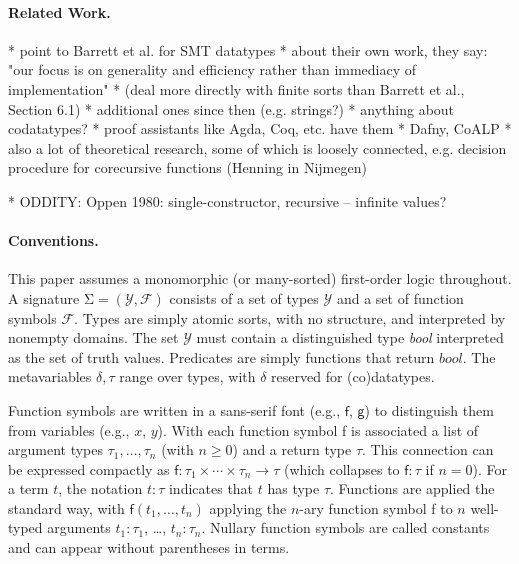 \documentclass[a4paper,oribibl,envcountsame,draft]{llncs}
\newcommand\Sig{\mathrm{\Sigma}}
\newcommand\const[1]{\textsf{#1}}
\newcommand\ty[1]{\textit{#1}}
\newcommand\Types{\mathcal{Y}}
\newcommand\Funcs{\mathcal{F}}
\begin{document}
\paragraph{Related Work.}

    * point to Barrett et al. for SMT datatypes
      * about their own work, they say: "our focus is on generality and
        efficiency rather than immediacy of implementation"
      * (deal more directly with finite sorts than Barrett et al., Section 6.1)
    * additional ones since then (e.g. strings?)
    * anything about codatatypes?
      * proof assistants like Agda, Coq, etc. have them
      * Dafny, CoALP
      * also a lot of theoretical research, some of which is loosely connected,
        e.g. decision procedure for corecursive functions (Henning in Nijmegen)

    * ODDITY: Oppen 1980: single-constructor, recursive -- infinite values?

\paragraph{Conventions.}
This paper assumes a monomorphic (or many-sorted) first-order logic throughout.
A signature $\Sig = (\Types, \Funcs)$ consists of a set of types $\Types$ and a
set of function symbols $\Funcs$. Types are simply atomic sorts, with no
structure, and interpreted by nonempty domains. The set $\Types$ must contain a
distinguished type \ty{bool} interpreted as the set of truth
values. %
Predicates are simply functions that return $\ty{bool}$.
The metavariables $\delta, \tau$ range over types, with $\delta$ reserved
for (co)datatypes.

Function symbols are written in a sans-serif font (e.g., $\const{f}$, $\const{g}$) to
distinguish them from variables (e.g., $x$, $y$). With each function symbol \const{f}
is associated a list of argument types $\tau_1,\ldots,\tau_n$ (with $n \ge 0$)
and a return type $\tau$. This connection can be expressed compactly as
$\const{f} : \tau_1 \times \cdots \times \tau_n \to \tau$
(which collapses to $\const{f} : \tau$ if $n = 0$).
For a term $t$, the notation $t : \tau$ indicates that $t$ has type $\tau$.
Functions are applied the standard way, with $\const{f}(t_1,\ldots,t_n)$
applying the $n$-ary function symbol
\const{f} to $n$ well-typed arguments $t_1 : \tau_1$, \ldots, $t_n :
\tau_n$. Nullary function symbols are called constants and can appear without
parentheses in terms.
\end{document}
